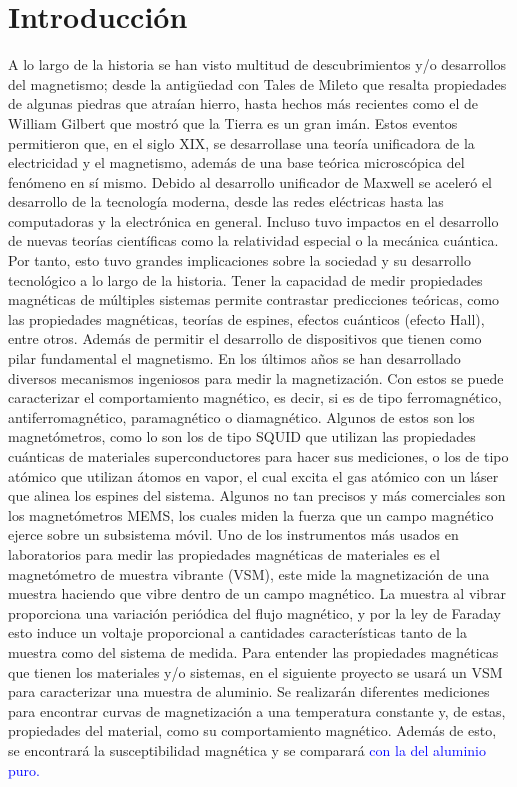 \documentclass[14pt,a4paper,twocolumn]{article}
\begin{document}
\section{Introducción}
A lo largo de la historia se han visto multitud de descubrimientos y/o desarrollos del magnetismo; desde la antigüedad con Tales de Mileto que resalta propiedades de algunas piedras que atraían hierro, hasta hechos más recientes como el de William Gilbert que mostró que la Tierra es un gran imán. Estos eventos permitieron que, en el siglo XIX, se desarrollase una teoría unificadora de la electricidad y el magnetismo, además de una base teórica microscópica del fenómeno en sí mismo. Debido al desarrollo unificador de Maxwell se aceleró el desarrollo de la tecnología moderna, desde las redes eléctricas hasta las computadoras y la electrónica en general. Incluso tuvo impactos en el desarrollo de nuevas teorías científicas como la relatividad especial o la mecánica cuántica. Por tanto, esto tuvo grandes implicaciones sobre la sociedad y su desarrollo tecnológico a lo largo de la historia.
Tener la capacidad de medir propiedades magnéticas de múltiples sistemas permite contrastar predicciones teóricas, como las propiedades magnéticas, teorías de espines, efectos cuánticos (efecto Hall), entre otros. Además de permitir el desarrollo de dispositivos que tienen como pilar fundamental el magnetismo. En los últimos años se han desarrollado diversos mecanismos ingeniosos para medir la magnetización. Con estos se puede caracterizar el comportamiento magnético, es decir, si es de tipo ferromagnético, antiferromagnético, paramagnético o diamagnético. Algunos de estos son los magnetómetros, como lo son los de tipo SQUID que utilizan las propiedades cuánticas de materiales superconductores para hacer sus mediciones, o los de tipo atómico que utilizan átomos en vapor, el cual excita el gas atómico con un láser que alinea los espines del sistema. Algunos no tan precisos y más comerciales son los magnetómetros MEMS, los cuales miden la fuerza que un campo magnético ejerce sobre un subsistema móvil. Uno de los instrumentos más usados en laboratorios para medir las propiedades magnéticas de materiales es el magnetómetro de muestra vibrante (VSM), este mide la magnetización de una muestra haciendo que vibre dentro de un campo magnético. La muestra al vibrar proporciona una variación periódica del flujo magnético, y por la ley de Faraday esto induce un voltaje proporcional a cantidades características tanto de la muestra como del sistema de medida.
Para entender las propiedades magnéticas que tienen los materiales y/o sistemas, en el siguiente proyecto se usará un VSM para caracterizar una muestra de aluminio. Se realizarán diferentes mediciones para encontrar curvas de magnetización a una temperatura constante y, de estas, propiedades del material, como su comportamiento magnético. Además de esto, se encontrará la susceptibilidad magnética y se comparará \textcolor{blue}{con la del aluminio puro.}
\end{document}
